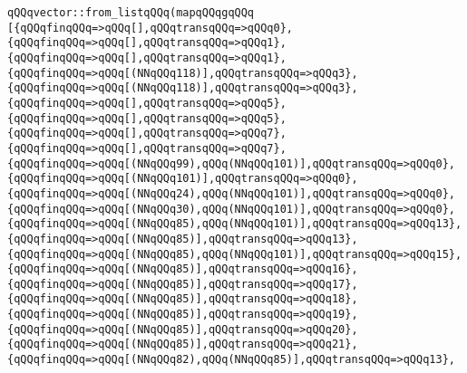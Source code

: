 \verb|qQQqvector::from_listqQQq(mapqQQqgqQQq|\newline
\verb|[{qQQqfinqQQq=>qQQq[],qQQqtransqQQq=>qQQq0},|\newline
\verb|{qQQqfinqQQq=>qQQq[],qQQqtransqQQq=>qQQq1},|\newline
\verb|{qQQqfinqQQq=>qQQq[],qQQqtransqQQq=>qQQq1},|\newline
\verb|{qQQqfinqQQq=>qQQq[(NNqQQq118)],qQQqtransqQQq=>qQQq3},|\newline
\verb|{qQQqfinqQQq=>qQQq[(NNqQQq118)],qQQqtransqQQq=>qQQq3},|\newline
\verb|{qQQqfinqQQq=>qQQq[],qQQqtransqQQq=>qQQq5},|\newline
\verb|{qQQqfinqQQq=>qQQq[],qQQqtransqQQq=>qQQq5},|\newline
\verb|{qQQqfinqQQq=>qQQq[],qQQqtransqQQq=>qQQq7},|\newline
\verb|{qQQqfinqQQq=>qQQq[],qQQqtransqQQq=>qQQq7},|\newline
\verb|{qQQqfinqQQq=>qQQq[(NNqQQq99),qQQq(NNqQQq101)],qQQqtransqQQq=>qQQq0},|\newline
\verb|{qQQqfinqQQq=>qQQq[(NNqQQq101)],qQQqtransqQQq=>qQQq0},|\newline
\verb|{qQQqfinqQQq=>qQQq[(NNqQQq24),qQQq(NNqQQq101)],qQQqtransqQQq=>qQQq0},|\newline
\verb|{qQQqfinqQQq=>qQQq[(NNqQQq30),qQQq(NNqQQq101)],qQQqtransqQQq=>qQQq0},|\newline
\verb|{qQQqfinqQQq=>qQQq[(NNqQQq85),qQQq(NNqQQq101)],qQQqtransqQQq=>qQQq13},|\newline
\verb|{qQQqfinqQQq=>qQQq[(NNqQQq85)],qQQqtransqQQq=>qQQq13},|\newline
\verb|{qQQqfinqQQq=>qQQq[(NNqQQq85),qQQq(NNqQQq101)],qQQqtransqQQq=>qQQq15},|\newline
\verb|{qQQqfinqQQq=>qQQq[(NNqQQq85)],qQQqtransqQQq=>qQQq16},|\newline
\verb|{qQQqfinqQQq=>qQQq[(NNqQQq85)],qQQqtransqQQq=>qQQq17},|\newline
\verb|{qQQqfinqQQq=>qQQq[(NNqQQq85)],qQQqtransqQQq=>qQQq18},|\newline
\verb|{qQQqfinqQQq=>qQQq[(NNqQQq85)],qQQqtransqQQq=>qQQq19},|\newline
\verb|{qQQqfinqQQq=>qQQq[(NNqQQq85)],qQQqtransqQQq=>qQQq20},|\newline
\verb|{qQQqfinqQQq=>qQQq[(NNqQQq85)],qQQqtransqQQq=>qQQq21},|\newline
\verb|{qQQqfinqQQq=>qQQq[(NNqQQq82),qQQq(NNqQQq85)],qQQqtransqQQq=>qQQq13},|\newline
